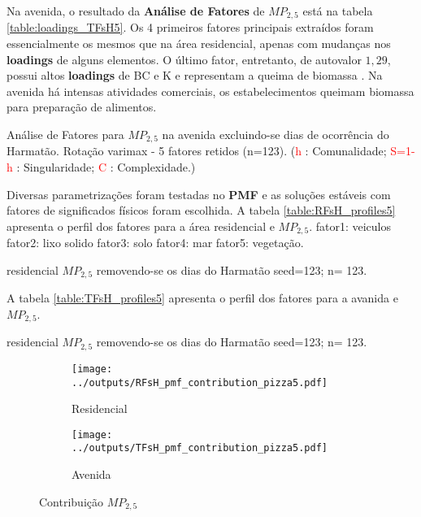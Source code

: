 Na avenida, o resultado da \textbf{Análise de Fatores} de $MP_{2,5}$ está na 
tabela \ref{table:loadings_TFsH5}. Os 4 primeiros fatores principais extraídos 
foram essencialmente os mesmos que na área residencial, apenas com mudanças nos 
\textbf{loadings} de alguns elementos. O último fator, entretanto, de autovalor
$1,29$, possui altos \textbf{loadings} de BC e K e representam a queima de 
biomassa \citep{reid2005}. Na avenida há intensas atividades comerciais, 
os estabelecimentos queimam biomassa para preparação de alimentos.   

\begin{table}[H]
  
  \caption{Análise de Fatores para $MP_{2,5}$ na avenida
           excluindo-se dias de ocorrência do Harmatão.
           Rotação varimax - 5 fatores retidos (n=123).
           (\textcolor{red}{h} : Comunalidade; 
           \textcolor{red}{S=1-h} : Singularidade; 
           \textcolor{red}{C} : Complexidade.)
           \label{table:loadings_TFsH5}}
\end{table}


Diversas parametrizações foram testadas no \textbf{PMF} e as soluções estáveis 
com fatores de significados físicos foram escolhida. 
A tabela \ref{table:RFsH_profiles5} apresenta o perfil dos fatores para a área
residencial e $MP_{2,5}$. 
fator1: veiculos
fator2: lixo solido
fator3: solo
fator4: mar
fator5: vegetação.

\begin{table}[H]
  \centering
    
    \caption{residencial $MP_{2,5}$ removendo-se os dias do Harmatão 
              seed=123; n= 123. 
             \label{table:RFsH_profiles5}}
\end{table}

A tabela \ref{table:TFsH_profiles5} apresenta o perfil dos fatores para a avanida
e $MP_{2,5}$.

\begin{table}[H]
  \centering
    
    \caption{residencial $MP_{2,5}$ removendo-se os dias do Harmatão 
              seed=123; n= 123. 
             \label{table:TFsH_profiles5}}
\end{table}

\begin{figure}[H]
  \centering
  \begin{subfigure}[b]{0.45\textwidth}
    \texttt{[image: ../outputs/RFsH\_pmf\_contribution\_pizza5.pdf]}
    \caption{Residencial}
  \end{subfigure}%
  \begin{subfigure}[b]{0.45\textwidth}
    \texttt{[image: ../outputs/TFsH\_pmf\_contribution\_pizza5.pdf]}
    \caption{Avenida}
  \end{subfigure}
  \caption{Contribuição $MP_{2,5}$ \label{a:kkk}}
\end{figure}


